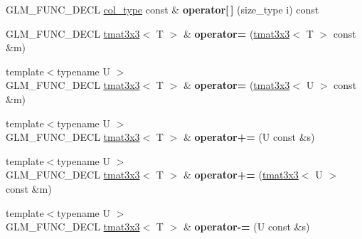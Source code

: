 \begin{DoxyCompactItemize}
\item 
\hypertarget{structglm_1_1detail_1_1tmat3x3_acc2d48e3c3179a904bd5de651871c216}{G\-L\-M\-\_\-\-F\-U\-N\-C\-\_\-\-D\-E\-C\-L \hyperlink{structglm_1_1detail_1_1tvec3}{col\-\_\-type} const \& {\bfseries operator\mbox{[}$\,$\mbox{]}} (size\-\_\-type i) const }\label{structglm_1_1detail_1_1tmat3x3_acc2d48e3c3179a904bd5de651871c216}

\item 
\hypertarget{structglm_1_1detail_1_1tmat3x3_ab0b2468efadce20e29801a4c604b74ed}{G\-L\-M\-\_\-\-F\-U\-N\-C\-\_\-\-D\-E\-C\-L \hyperlink{structglm_1_1detail_1_1tmat3x3}{tmat3x3}$<$ T $>$ \& {\bfseries operator=} (\hyperlink{structglm_1_1detail_1_1tmat3x3}{tmat3x3}$<$ T $>$ const \&m)}\label{structglm_1_1detail_1_1tmat3x3_ab0b2468efadce20e29801a4c604b74ed}

\item 
\hypertarget{structglm_1_1detail_1_1tmat3x3_af9fbbe1e38ba72329be511e3f196d8a6}{{\footnotesize template$<$typename U $>$ }\\G\-L\-M\-\_\-\-F\-U\-N\-C\-\_\-\-D\-E\-C\-L \hyperlink{structglm_1_1detail_1_1tmat3x3}{tmat3x3}$<$ T $>$ \& {\bfseries operator=} (\hyperlink{structglm_1_1detail_1_1tmat3x3}{tmat3x3}$<$ U $>$ const \&m)}\label{structglm_1_1detail_1_1tmat3x3_af9fbbe1e38ba72329be511e3f196d8a6}

\item 
\hypertarget{structglm_1_1detail_1_1tmat3x3_a377ac0fd8b02b5f1b6d8b4284802fcb1}{{\footnotesize template$<$typename U $>$ }\\G\-L\-M\-\_\-\-F\-U\-N\-C\-\_\-\-D\-E\-C\-L \hyperlink{structglm_1_1detail_1_1tmat3x3}{tmat3x3}$<$ T $>$ \& {\bfseries operator+=} (U const \&s)}\label{structglm_1_1detail_1_1tmat3x3_a377ac0fd8b02b5f1b6d8b4284802fcb1}

\item 
\hypertarget{structglm_1_1detail_1_1tmat3x3_a3d7dc7caf2167cf9a671eaa5032138e0}{{\footnotesize template$<$typename U $>$ }\\G\-L\-M\-\_\-\-F\-U\-N\-C\-\_\-\-D\-E\-C\-L \hyperlink{structglm_1_1detail_1_1tmat3x3}{tmat3x3}$<$ T $>$ \& {\bfseries operator+=} (\hyperlink{structglm_1_1detail_1_1tmat3x3}{tmat3x3}$<$ U $>$ const \&m)}\label{structglm_1_1detail_1_1tmat3x3_a3d7dc7caf2167cf9a671eaa5032138e0}

\item 
\hypertarget{structglm_1_1detail_1_1tmat3x3_a8636caa88fa286fa0152acdba0e19884}{{\footnotesize template$<$typename U $>$ }\\G\-L\-M\-\_\-\-F\-U\-N\-C\-\_\-\-D\-E\-C\-L \hyperlink{structglm_1_1detail_1_1tmat3x3}{tmat3x3}$<$ T $>$ \& {\bfseries operator-\/=} (U const \&s)}\label{structglm_1_1detail_1_1tmat3x3_a8636caa88fa286fa0152acdba0e19884}


\end{DoxyCompactItemize}
